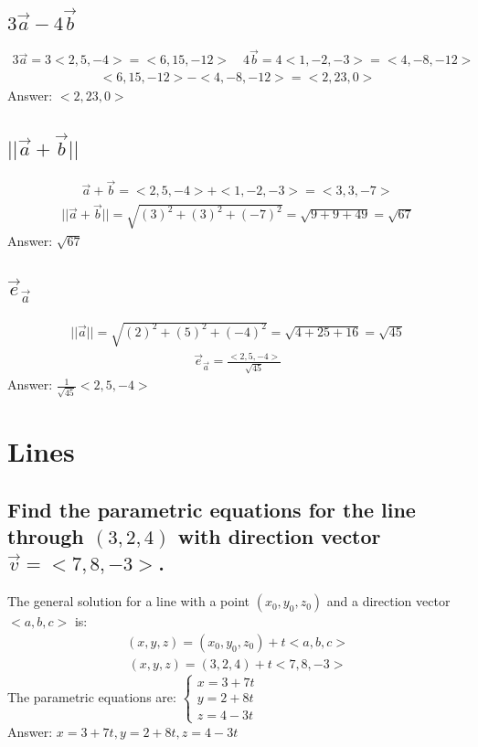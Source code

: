 \documentclass{article}
\begin{document}
\subsection{$3\vec{a} - 4\vec{b}$}
\begin{align*}
	3\vec{a} = 3<2, 5, -4> = <6, 15, -12> \quad 4\vec{b} = 4<1, -2, -3> = <4, -8, -12>
\end{align*}
\begin{align*}
	<6, 15, -12> - <4, -8, -12> = <2, 23, 0>
\end{align*}
Answer: $<2, 23, 0>$
\subsection{$||\vec{a} + \vec{b}||$}
\begin{align*}
	\vec{a} + \vec{b} = <2, 5, -4> + <1, -2, -3> = <3, 3, -7>
\end{align*}
\begin{align*}
	||\vec{a} + \vec{b}|| = \sqrt{(3)^2 + (3)^2 + (-7)^2} = \sqrt{9 + 9 + 49} = \sqrt{67}
\end{align*}
Answer: $\sqrt{67}$
\subsection{$\vec{e}_{\vec{a}}$}
\begin{align*}
	|| \vec{a} || = \sqrt{(2)^2 + (5)^2 + (-4)^2} = \sqrt{4 + 25 + 16} = \sqrt{45}
\end{align*}
\begin{align*}
	\vec{e}_{\vec{a}} = \frac{<2, 5, -4>}{\sqrt{45}}
\end{align*}
Answer: $\frac{1}{\sqrt{45}}<2, 5, -4>$

\section{Lines}
\subsection{Find the parametric equations for the line through $(3, 2, 4)$ with direction vector $\vec{v} = <7, 8, -3>$.}
The general solution for a line with a point $(x_0, y_0, z_0)$ and a direction vector $<a, b, c>$ is:
\begin{align*}
	(x, y, z) = (x_0, y_0, z_0) + t<a, b, c>
\end{align*}
\begin{align*}
	(x, y, z) = (3, 2, 4) + t<7, 8, -3>
\end{align*}
The parametric equations are: $
	\begin{cases}
		x = 3 + 7t \\
		y = 2 + 8t \\
		z = 4 - 3t
	\end{cases}$ \\[10pt]
Answer: $x = 3 + 7t, y = 2 + 8t, z = 4 - 3t$
\end{document}
